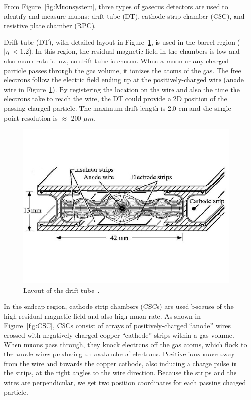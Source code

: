 From Figure~\ref{fig:Muonsystem}, three types of gaseous detectors are used to identify and measure muons: drift tube (DT), cathode strip chamber (CSC), and resistive plate chamber (RPC). 

Drift tube (DT), with detailed layout in Figure~\ref{fig:DT}, is used in the barrel region ( $|\eta| < 1.2$).  In this region, the residual magnetic field in the chambers is low and also muon rate is low, so drift tube is chosen. When a muon or any charged particle passes through the gas volume, it ionizes the atoms of the gas. The free electrons follow the electric field ending up at the 
positively-charged wire (anode wire in Figure~\ref{fig:DT}). By registering the location on the wire and also the time the electrons take to reach the wire, the DT could provide a 2D position of the passing charged particle.  
The maximum drift length is 2.0 cm and the single point resolution is $\approx$ 200 $\mu m$.
 
\begin{figure}[!htbp]
\centering
\includegraphics[width=.9\textwidth]{figures/DriftTubeDetails.jpg}
\caption{Layout of the drift tube~\cite{web:DT}.}
\label{fig:DT}
\end{figure} 
 
In the endcap region,  cathode strip chambers (CSCs) are used because of the high residual magnetic field and also high muon rate. As shown in Figure~\ref{fig:CSC}, 
CSCs consist of arrays of positively-charged ``anode'' wires crossed with negatively-charged copper ``cathode'' strips within a gas volume. When muons pass through, they knock electrons off the gas atoms, which flock to the anode wires producing an avalanche of electrons. Positive ions move away from the wire and towards the copper cathode, also inducing a charge pulse in the strips, at 
the right angles to the wire direction.
Because the strips and the wires are perpendicular, we get two position coordinates for each passing charged particle.

